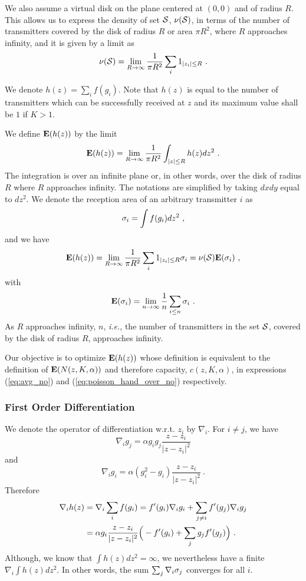 \documentclass[12pt,english]{article}
\begin{document}
We also assume a virtual disk on the plane centered at $(0,0)$ and of radius $R$. This allows us to express the density of set ${\cal S}$, $\nu({\cal S})$, in terms of the number of transmitters covered by the disk of radius $R$ or area $\pi R^2$, where $R$ approaches infinity, and it is given by a limit as
$$
\nu({\cal S})=\lim_{R\to\infty}\frac{1}{\pi R^2}\sum_i 1_{|z_i|\le R}~.
$$

We denote \mbox{$h(z)=\sum_i{f(g_i)}$}. Note that $h(z)$ is equal to the number of transmitters which can be successfully received at $z$ and its maximum value shall be $1$ if \mbox{$K>1$}. 

We define $\E(h(z))$ by the limit
$$
\E(h(z))=\lim_{R\to\infty}\frac{1}{\pi R^2}\int_{|z|\le R}h(z)dz^2~.
$$
The integration is over an infinite plane or, in other words, over the disk of radius $R$ where $R$ approaches infinity. The notations are simplified by taking $dxdy$ equal to $dz^2$. We denote the reception area of an arbitrary transmitter $i$ as 
$$
\ss_i=\int f(g_i)dz^2~,
$$
and we have 
$$
\E(h(z))=\lim_{R\to\infty}\frac{1}{\pi R^2}\sum_i 1_{|z_i|\le R}\ss_i=\nu({\cal S})\E(\ss_i)~,
$$
with
$$
\E(\ss_i)=\lim_{n\to\infty}\frac{1}{n}\sum_{i\le n}\ss_i~.
$$
As $R$ approaches infinity, $n$, {\it i.e.}, the number of transmitters in the set ${\cal S}$, covered by the disk of radius $R$, approaches infinity. 

Our objective is to optimize $\E(h(z))$ whose definition is equivalent to the definition of $\E(N(z,K,\alpha))$ and therefore capacity, $c(z,K,\alpha)$, in expressions (\ref{eq:avg_no}) and (\ref{eq:poisson_hand_over_no}) respectively. 

\subsubsection{First Order Differentiation}
\label{sec:grid_first_order}

We denote the operator of differentiation w.r.t. $z_i$ by $\nabla_i$. For \mbox{$i\neq j$}, we have 
$$
\nabla_i g_j=\alpha g_ig_j\frac{z-z_i}{|z-z_i|^2}
$$ 
and 
$$
\nabla_i g_i=\alpha(g_i^2-g_i)\frac{z-z_i}{|z-z_i|^2}~.
$$ 
Therefore
\begin{align}
\nabla_i h(z)&=\nabla_i\sum_if(g_i)=f'(g_i)\nabla_ig_i+\sum_{j\neq i}f'(g_j)\nabla_ig_j \notag \\
&=\alpha g_i\frac{z-z_i}{|z-z_i|^2}\Big(-f'(g_i)+\sum_j g_jf'(g_j)\Big)~. \notag
\end{align}
Although, we know that \mbox{$\int h(z)dz^2=\infty$}, we nevertheless have a finite $\nabla_i \int h(z)dz^2$. In other words, the sum $\sum_{j}\nabla_i\ss_j$ converges for all $i$. 
\end{document}
